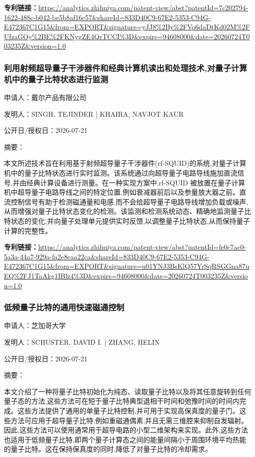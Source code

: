 \documentclass[12pt,a4paper]{ctexart}
\begin{document}
\noindent\textbf{专利链接：}\url{https://analytics.zhihuiya.com/patent-view/abst?patentId=7c202794-1622-488c-b042-be5b8af16c57&shareId=833D40C9-67E2-5353-C94G-E472367C1G15&from=EXPORT&signature=yJJ8%2By%2FVo6daDtKd02M%2FUfzaGOy%2BE%2FKNygZE4QrTCCI%3D&expire=94608000&date=20260724T003235Z&version=1.0}

\subsubsection{ 利用射频超导量子干涉器件和经典计算机读出和处理技术,对量子计算机中的量子比特状态进行监测 }

申请人：戴尔产品有限公司

发明人：SINGH, TEJINDER | KHAIRA, NAVJOT KAUR

公开日/授权日：2026-07-21

摘要：

本文所述技术旨在利用基于射频超导量子干涉器件(rf-SQUID)的系统,对量子计算机中的量子比特状态进行实时监测。该系统通过向超导量子电路导线施加直流信号,并由经典计算设备进行测量。在一种实现方案中,rf-SQUID 被放置在量子计算机中超导量子电路导线之间的特定位置,例如衰减器前后以及参量放大器之前。直流控制信号有助于检测磁通量和电感,而不会给超导量子电路导线增加负载或噪声,从而增强对量子比特状态变化的检测。该监测和检测系统动态、精确地监测量子比特状态的变化,并向量子处理单元提供实时反馈,以调整量子比特状态,从而保持量子计算的完整性。

\noindent\textbf{专利链接：}\url{https://analytics.zhihuiya.com/patent-view/abst?patentId=fe0c7ac0-5a3a-44a7-929a-fa2e8caa22ca&shareId=833D40C9-67E2-5353-C94G-E472367C1G15&from=EXPORT&signature=u01YNJ3BsKlQ57YrSqRSGGna87uEQ%2FJ1TaAkg1IBlz4%3D&expire=94608000&date=20260724T003235Z&version=1.0}

\subsubsection{ 低频量子比特的通用快速磁通控制 }

申请人：芝加哥大学

发明人：SCHUSTER, DAVID I. | ZHANG, HELIN

公开日/授权日：2026-07-21

摘要：

本文介绍了一种将量子比特初始化为纯态、读取量子比特以及将其任意旋转到任何量子态的方法,这些方法可在短于量子比特典型退相干时间和弛豫时间的时间内完成。这些方法提供了通用的单量子比特控制,并可用于实现高保真度的量子门。这些方法可应用于超导量子比特,例如重磁通偶素,并且无需三维腔来抑制自发辐射。因此,这些方法可以使用通常用于超导电路的小型二维架构来实现。此外,这些方法也适用于低频量子比特,即两个量子计算态之间的能量间隔小于周围环境平均热能的量子比特。这在保持保真度的同时,降低了对量子比特的冷却需求。
\end{document}
